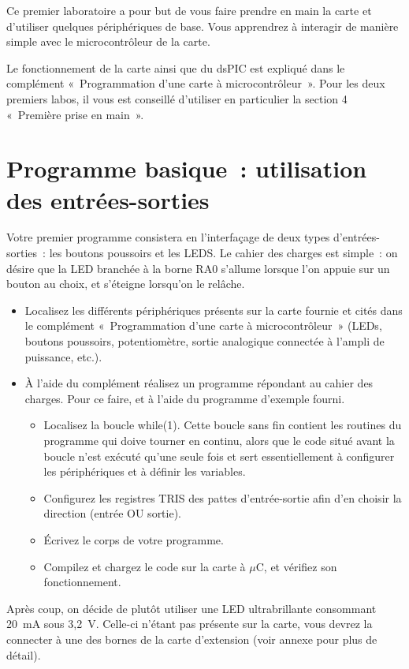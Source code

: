 \documentclass[11pt,a4paper]{article}
\theoremstyle{definition}%
\begin{document}
Ce premier laboratoire a pour but de vous faire prendre en main la carte et d’utiliser quelques périphériques de base. Vous apprendrez à interagir de manière simple avec le microcontrôleur de la carte.

Le fonctionnement de la carte ainsi que du dsPIC est expliqué dans le complément «~Programmation d’une carte à microcontrôleur~». 
Pour les deux premiers labos, il vous est conseillé d’utiliser en particulier la section 4 «~Première prise en main~».


\section{Programme basique~: utilisation des entrées-sorties}
Votre premier programme consistera en l’interfaçage de deux types d’entrées-sorties~: les boutons poussoirs et les LEDS.
Le cahier des charges est simple~: on désire que la LED branchée à la borne RA0 s’allume lorsque l’on appuie sur un bouton au choix, et s’éteigne lorsqu’on le relâche.

\begin{itemize}
	\item Localisez les différents périphériques présents sur la carte fournie et cités dans le complément «~Programmation d’une carte à microcontrôleur~» (LEDs, boutons poussoirs, potentiomètre, sortie analogique connectée à l’ampli de puissance, etc.).
	\item À l’aide du complément réalisez un programme répondant au cahier des charges. Pour ce faire, et à l’aide du programme d’exemple fourni.
	\begin{itemize}
		\item Localisez la boucle while(1).
		Cette boucle sans fin contient les routines du programme qui doive tourner en continu, alors que le code situé avant la boucle n’est exécuté qu’une seule fois et sert essentiellement à configurer les périphériques et à définir les variables.
		\item Configurez les registres TRIS  des pattes d’entrée-sortie afin d’en choisir la direction (entrée OU sortie).
		\item Écrivez le corps de votre programme.
		\item Compilez et chargez le code sur la carte à $\mu$C, et vérifiez son fonctionnement.
	\end{itemize}
\end{itemize}

Après coup, on décide de plutôt utiliser une LED ultrabrillante consommant 20~mA sous 3,2~V.
Celle-ci n’étant pas présente sur la carte, vous devrez la connecter à une des bornes de la carte d’extension (voir annexe pour plus de détail).
\end{document}
